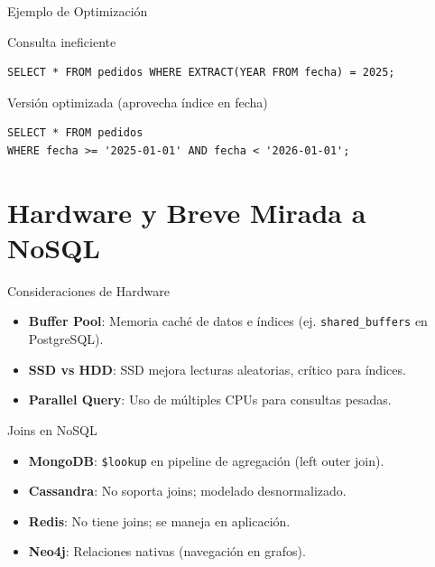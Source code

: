 \documentclass[aspectratio=169, 10pt, xcolor=table]{beamer}
\begin{document}
\begin{frame}[fragile]{Ejemplo de Optimización}
    \begin{block}{Consulta ineficiente}
        \begin{verbatim}
SELECT * FROM pedidos WHERE EXTRACT(YEAR FROM fecha) = 2025;
        \end{verbatim}
    \end{block}
    \begin{block}{Versión optimizada (aprovecha índice en fecha)}
        \begin{verbatim}
SELECT * FROM pedidos 
WHERE fecha >= '2025-01-01' AND fecha < '2026-01-01';
        \end{verbatim}
    \end{block}
\end{frame}

\section{Hardware y Breve Mirada a NoSQL}

\begin{frame}{Consideraciones de Hardware}
    \begin{itemize}
        \item \textbf{Buffer Pool}: Memoria caché de datos e índices (ej. \texttt{shared\_buffers} en PostgreSQL).
        \item \textbf{SSD vs HDD}: SSD mejora lecturas aleatorias, crítico para índices.
        \item \textbf{Parallel Query}: Uso de múltiples CPUs para consultas pesadas.
    \end{itemize}
\end{frame}

\begin{frame}{Joins en NoSQL}
    \begin{itemize}
        \item \textbf{MongoDB}: \texttt{\$lookup} en pipeline de agregación (left outer join).
        \item \textbf{Cassandra}: No soporta joins; modelado desnormalizado.
        \item \textbf{Redis}: No tiene joins; se maneja en aplicación.
        \item \textbf{Neo4j}: Relaciones nativas (navegación en grafos).
    \end{itemize}
\end{frame}
\end{document}
